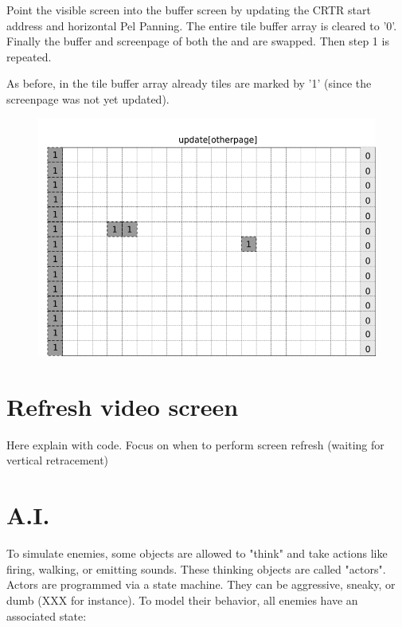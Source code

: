 \documentclass[book.tex]{subfiles}
\begin{document}
\begin{minipage}{.4\textwidth}
Point the visible screen into the buffer screen by updating the CRTR start address and horizontal Pel Panning. The entire tile buffer array is cleared to '0'. Finally the buffer and screenpage of both the  and  are swapped. Then step 1 is repeated. \\
\par
As before, in the tile buffer array already tiles are marked by '1' (since the screenpage was not yet updated).
 \end{minipage}
\begin{minipage}{.6\textwidth}
\begin{figure}[H]
  \centering
 \includegraphics[width=.9\textwidth]{screenshots_300dpi/game/Scroll_KC4_6_1-scroll_update_final.png}
 \label{fig:kc4-6_update_final_img_1}  
\end{figure}
\end{minipage}

\pagebreak





\section{Refresh video screen}
Here explain with code. Focus on when to perform screen refresh (waiting for vertical retracement)

\section{A.I.}
To simulate enemies, some objects are allowed to "think" and take actions like firing, walking,
or emitting sounds. These thinking objects are called "actors".
Actors are programmed via a state machine. They can be aggressive, sneaky, or dumb
(XXX for instance). To model their behavior, all enemies have an associated state:
\end{document}

